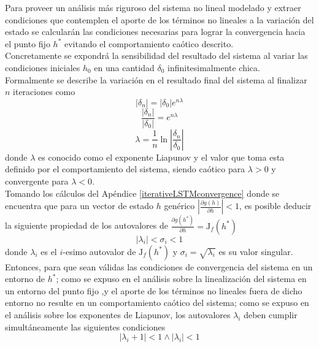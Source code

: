 \documentclass{article}
\begin{document}
	Para proveer un análisis más riguroso del sistema no lineal modelado y extraer condiciones que contemplen el aporte de los términos no lineales a la variación del estado se calcularán las condiciones necesarias para lograr la convergencia hacia el punto fijo $h^*$ evitando el comportamiento caótico descrito.\\
	Concretamente se expondrá la sensibilidad del resultado del sistema al variar las condiciones iniciales $h_0$ en una cantidad $\delta_0$ infinitesimalmente chica.\\
	Formalmente se describe la variación en el resultado final del sistema al finalizar $n$ iteraciones como 
	\begin{equation*}
	|\delta_n| = |\delta_0| e ^{n\lambda} 
	\end{equation*}
	\begin{equation*}
	\dfrac{|\delta_n|}{|\delta_0|} =  e ^{n\lambda} 
	\end{equation*}
	\begin{equation*}
	\lambda = \dfrac{1}{n} \ln\left\lvert\dfrac{\delta_n}{\delta_0}\right\rvert
	\end{equation*}
	donde $\lambda$ es conocido como el exponente Liapunov y el valor que toma esta definido por el comportamiento del sistema, siendo caótico para $\lambda > 0$ y convergente para $\lambda < 0$\cite{21StrogatzBook}. \\
	Tomando los cálculos del Apéndice \ref{iterativeLSTMconvergence} donde se encuentra que para un vector de estado $h$ genérico $\left\lvert \frac{\partial g(h)}{\partial h} \right\rvert < 1$, es posible deducir la siguiente propiedad de los autovalores de $\frac{\partial g(h^*)}{\partial h} = \mathrm{J}_f(h^*)$
	\begin{equation*}
	|\lambda_i| < \sigma_i < 1
	\end{equation*}
	donde $\lambda_i$ es el $i$-esimo autovalor de $\mathrm{J}_f(h^*)$ y $\sigma_i  = \sqrt{\lambda_i}$ es su valor singular. \\
	Entonces, para que sean válidas las condiciones de convergencia del sistema en un entorno de $h^*$; como se expuso en el análisis sobre la linealización del sistema en un entorno del punto fijo ,y el aporte de los términos no lineales fuera de dicho entorno no resulte en un comportamiento caótico del sistema; como se expuso en el análisis sobre los exponentes de Liapunov, los autovalores $\lambda_i$ deben cumplir simultáneamente las siguientes condiciones
	\begin{equation*}
	|\lambda_i + 1| < 1 \land |\lambda_i| < 1
	\end{equation*}
\end{document}
